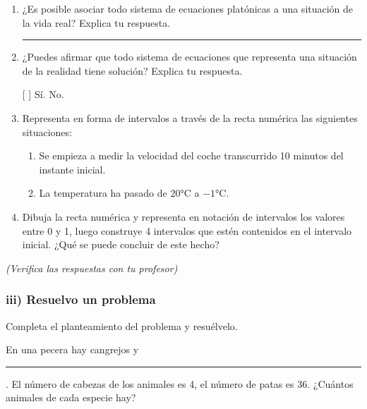 \documentclass[12pt,a4paper]{article}
\begin{document}
\begin{enumerate}
    \item ¿Es posible asociar todo sistema de ecuaciones platónicas a una situación de la vida real? Explica tu respuesta.

    \rule{10cm}{0.4pt}

    \item ¿Puedes afirmar que todo sistema de ecuaciones que representa una situación de la realidad tiene solución? Explica tu respuesta.

    [ ] Sí. \quad [ ] No.

    \item Representa en forma de intervalos a través de la recta numérica las siguientes situaciones:

        \begin{enumerate}[label=\alph*)]
            \item Se empieza a medir la velocidad del coche transcurrido 10 minutos del instante inicial.
            \item La temperatura ha pasado de 20°C a $-1$°C.
        \end{enumerate}

    \item Dibuja la recta numérica y representa en notación de intervalos los valores entre 0 y 1, luego construye 4 intervalos que estén contenidos en el intervalo inicial. ¿Qué se puede concluir de este hecho?
\end{enumerate}

\textit{(Verifica las respuestas con tu profesor)}

\subsubsection*{iii) Resuelvo un problema}

Completa el planteamiento del problema y resuélvelo.

En una pecera hay cangrejos y \rule{2cm}{0.4pt}. El número de cabezas de los animales es 4, el número de patas es 36. ¿Cuántos animales de cada especie hay?
\end{document}
